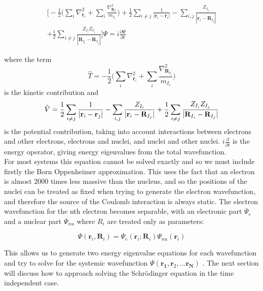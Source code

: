 \documentclass[10pt]{article}
\begin{document}
\begin{gather*}
	\biggr[-\frac{1}{2}\biggr(\sum_i\nabla^2_{\textbf{r}_i}+\sum_{i}\frac{\nabla^2_{\textbf{R}_{I_i}}}{m_{I_i}}\biggr)+\frac{1}{2}\sum_{i\not=j}\frac{1}{|\textbf{r}_i-\textbf{r}_i|}-\sum_{i,j}\frac{Z_{I_j}}{|\textbf{r}_i - \textbf{R}_{I_j}|}\\
	+\frac{1}{2}\sum_{i\not=j}\frac{Z_{I_i}Z_{I_j}}{|\textbf{R}_{I_i}-\textbf{R}_{I_j}|}\biggr]\Psi = i\frac{\partial\Psi}{\partial t}
\end{gather*}

where the term $$\hat{T} = -\frac{1}{2}\biggr(\sum_i\nabla^2_{\textbf{r}_i}+\sum_{i}\frac{\nabla^2_{\textbf{R}_{I_i}}}{m_{I_i}}\biggr)$$ is the kinetic contribution and $$\hat{V}=\frac{1}{2}\sum_{i\not=j}\frac{1}{|\textbf{r}_i-\textbf{r}_j|}-\sum_{i,j}\frac{Z_{I_i}}{|\textbf{r}_i - \textbf{R}_{I_j}|}\\
+\frac{1}{2}\sum_{i\not=j}\frac{Z_{I_i}Z_{I_j}}{|\textbf{R}_{I_i}-\textbf{R}_{I_j}|}$$ is the potential contribution, taking into account interactions between electrons and other electrons, electrons and nuclei, and nuclei and other nuclei.  $i\frac{\partial}{\partial t}$ is the energy operator, giving energy eigenvalues from the total wavefunction.\\

For most systems this equation cannot be solved exactly and so we must include firstly the Born Oppenheimer approximation. This uses the fact that an electron is almost 2000 times less massive than the nucleus, and so the positions of the nuclei can be treated as fixed when trying to generate the electron wavefunction, and therefore the source of the Coulomb interaction is always static. The electron wavefunction for the nth electron becomes separable, with an electronic part $\Psi_e$ and a nuclear part $\Psi_{nu}$ where $R_i$ are treated only as parameters:

\begin{equation*}
	\Psi(\textbf{r}_i,\textbf{R}_i) =  \Psi_e(\textbf{r}_i;\textbf{R}_i)\Psi_{nu}(\textbf{r}_{i})
\end{equation*}

This allows us to generate two energy eigenvalue equations for each wavefunction and try to solve for the systemic wavefunction $\Psi(\mathbf{r_1},\mathbf{r}_2,...\mathbf{r_N})$ \cite{rebolini2014range}. The next section will discuss how to approach solving the Schrödinger equation in the time independent case.
\end{document}
